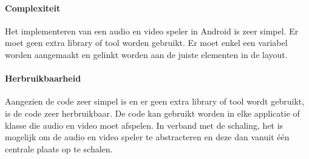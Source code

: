 \paragraph{Complexiteit}
Het implementeren van een audio en video speler in Android is zeer simpel. 
Er moet geen extra library of tool worden gebruikt. Er moet enkel een variabel worden aangemaakt
en gelinkt worden aan de juiste elementen in de layout.

\paragraph{Herbruikbaarheid}
Aangezien de code zeer simpel is en er geen extra library of tool wordt gebruikt,
is de code zeer herbruikbaar. De code kan gebruikt worden in elke applicatie of klasse die audio en video
moet afspelen. In verband met de schaling, het is mogelijk om de audio en video speler te abstracteren 
en deze dan vanuit één centrale plaats op te schalen. 
